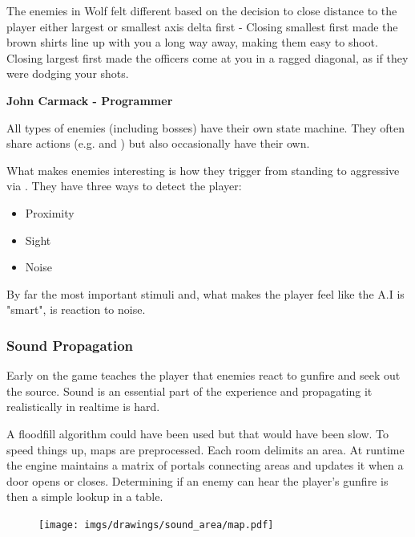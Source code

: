 \begin{fancyquotes}
The enemies in Wolf felt different based on the decision to close distance to the player either largest or smallest axis delta first - Closing smallest first made the brown shirts line up with you a long way away, making them easy to shoot.  Closing largest first made the officers come at you in a ragged diagonal, as if they were dodging your shots.\\
\par
\textbf{John Carmack - Programmer}
 \end{fancyquotes}
\par
All types of enemies (including bosses) have their own state machine. They often share actions (e.g.  and ) but also occasionally have their own.\\
\par
What makes enemies interesting is how they trigger from standing to aggressive via . They have three ways to detect the player:
\begin{itemize}
\item Proximity
\item Sight
\item Noise
\end{itemize}
By far the most important stimuli and, what makes the player feel like the A.I is "smart", is reaction to noise.





\subsubsection{Sound Propagation}
Early on the game teaches the player that enemies react to gunfire and seek out the source. Sound is an essential part of the experience and propagating it realistically in realtime is hard.\\
\par
 A floodfill algorithm could have been used but that would have been slow. To speed things up, maps are preprocessed. Each room delimits an area. At runtime the engine maintains a matrix of portals connecting areas and updates it when a door opens or closes. Determining if an enemy can hear the player's gunfire is then a simple lookup in a table.

\par
\begin{figure}[H]
 \centering
 \texttt{[image: imgs/drawings/sound\_area/map.pdf]}
 
\end{figure}

